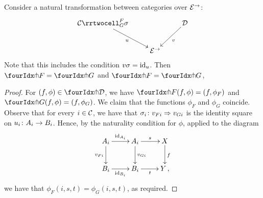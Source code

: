 \documentclass[reqno,10pt,a4paper,oneside]{amsart}
\begin{document}
\begin{proposition}
Consider a natural transformation between categories over $\catE^{\to}$:
\[
\xymatrix{
  \cal{C}
  \rrtwocell_G^F{\sigma}
 \ar[dr]_{u}
&&
  \cal{D}
  \ar[dl]^{v}
\\&
  \catE^{\to}
}
\]
Note that this includes the condition $v \sigma = \id_u$.
Then $\liftr{F} = \liftr{G}$ and $\liftl{F} = \liftl{G}$, 
\end{proposition}

\begin{proof} For $(f, \phi) \in \liftr{\cal{D}}$, we have $\liftr{F}(f, \phi) = (f, \phi_F)$ and $\liftr{G}(f, \phi) = (f, \phi_G)$.
We claim that the functions $\phi_F$ and $\phi_G$ coincide. Observe that 
for every $i \in \cal{C}$, we have that $\sigma_i \co v_{Fi}  \Rightarrow v_{Gi}$ is the identity square on $u_i
\co A_i \to B_i$. Hence, by the naturality condition for $\phi$, applied to the diagram 
\[
\xymatrix{
A_i \ar[r]^{\id_{A_i}} \ar[d]_{v_{Fi}}  & A_i \ar[d]^{v_{Gi}} \ar[r]^{s}  & X \ar[d]^{f} \\
B_i \ar[r]_{\id_{B_i}} & B_i \ar[r]_{t} & Y \, ,}
\]
we have  that $\phi_F(i, s, t) = \phi_G(i, s, t)$, as required.
\end{proof} 
\end{document}
